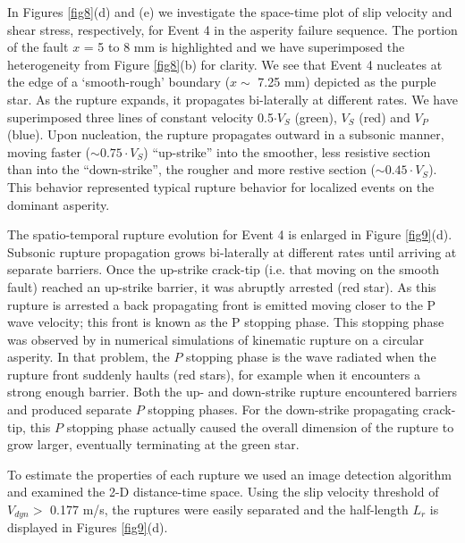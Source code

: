 \documentclass[preprint,1p, 10pt,authoryear]{elsarticle}
\begin{document}
In Figures \ref{fig8}(d) and (e) we investigate the space-time plot of slip velocity and shear stress, respectively, for Event 4 in the asperity failure sequence. The portion of the fault $x$ = 5 to 8 mm is highlighted and we have superimposed the heterogeneity from Figure \ref{fig8}(b) for clarity. We see that Event 4 nucleates at the edge of a `smooth-rough' boundary ($x \sim$ 7.25 mm) depicted as the purple star. As the rupture expands, it propagates bi-laterally at different rates. We have superimposed three lines of constant velocity 0.5$\cdot V_{S}$ (green), $V_{S}$ (red) and $V_{P}$ (blue).  Upon nucleation, the rupture propagates outward in a subsonic manner, moving faster ($\sim 0.75 \cdot V_{S}$) ``up-strike'' into the smoother, less resistive section than into the ``down-strike'', the rougher and more restive section ($\sim 0.45\cdot V_{S}$). This behavior represented typical rupture behavior for localized events on the dominant asperity.

The spatio-temporal rupture evolution for Event 4 is enlarged in Figure \ref{fig9}(d).  Subsonic rupture propagation grows bi-laterally at different rates until arriving at separate barriers. Once the up-strike crack-tip (i.e. that moving on the smooth fault) reached an up-strike barrier, it was abruptly arrested (red star).  As this rupture is arrested a back propagating front is emitted moving closer to the P wave velocity; this front is known as the P stopping phase. This stopping phase was observed by \citet{Madariaga1976} in numerical simulations of kinematic rupture on a circular asperity.  In that problem, the $P$ stopping phase is the wave radiated when the rupture front suddenly haults (red stars), for example when it encounters a strong enough barrier.  Both the up- and down-strike rupture encountered barriers and produced separate $P$ stopping phases.  For the down-strike propagating crack-tip, this $P$ stopping phase actually caused the overall dimension of the rupture to grow larger, eventually terminating at the green star. 

To estimate the properties of each rupture we used an image detection algorithm \citep{Gonzalez2009} and examined the 2-D distance-time space. Using the slip velocity threshold of $V_{dyn}>$ 0.177 m/s, the ruptures were easily separated and the half-length $L_{r}$ is displayed in Figures \ref{fig9}(d).
\end{document}
